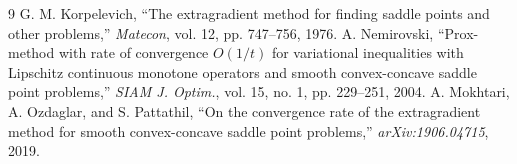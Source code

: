 \documentclass{article}
\theoremstyle{plain}
\theoremstyle{definition}
\begin{document}

\begin{thebibliography}{9}
 G. M. Korpelevich, ``The extragradient method for finding saddle points and other problems,'' \emph{Matecon}, vol. 12, pp. 747--756, 1976.
 A. Nemirovski, ``Prox-method with rate of convergence $O(1/t)$ for variational inequalities with Lipschitz continuous monotone operators and smooth convex-concave saddle point problems,'' \emph{SIAM J. Optim.}, vol. 15, no. 1, pp. 229--251, 2004.
 A. Mokhtari, A. Ozdaglar, and S. Pattathil, ``On the convergence rate of the extragradient method for smooth convex-concave saddle point problems,'' \emph{arXiv:1906.04715}, 2019.
\end{thebibliography}
\end{document}
